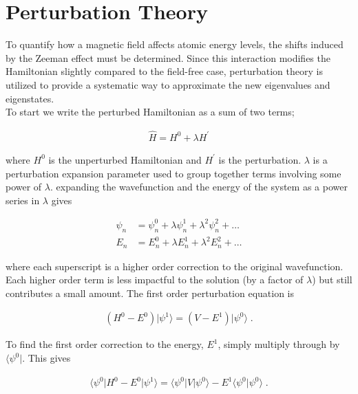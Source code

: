             

    \section{Perturbation Theory} \label{sec:Perturbation_Theory}
        To quantify how a magnetic field affects atomic energy levels, the shifts induced by the Zeeman effect must be determined. Since this interaction modifies the Hamiltonian slightly compared to the field-free case, perturbation theory is utilized to provide a systematic way to approximate the new eigenvalues and eigenstates.\\

        \noindent To start we write the perturbed Hamiltonian as a sum of two terms;

        \begin{align}
            \hat{H} = H^0 + \lambda H^\prime
        \end{align}

        \noindent where $H^0$ is the unperturbed Hamiltonian and $H^\prime$ is the perturbation. $\lambda$ is a perturbation expansion parameter used to group together terms involving some power of $\lambda$. expanding the wavefunction and the energy of the system as a power series in $\lambda$ gives \cite{Griffiths_2018}

        \begin{align}
            \psi_n &= \psi_n^0 + \lambda \psi_n^1 + \lambda^2 \psi_n^2 + \dots\\
            E_n &= E_n^0 + \lambda E_n^1 + \lambda^2 E_n^2 + \dots
        \end{align}

        \noindent where each superscript is a higher order correction to the original wavefunction. Each higher order term is less impactful to the solution (by a factor of $\lambda$) but still contributes a small amount. The first order perturbation equation is

        \begin{align}
            \left( H^0 - E^0 \right) \vert \psi^1 \rangle = \left(V - E^1 \right) \vert \psi^0 \rangle\;.
        \end{align}

        \noindent To find the first order correction to the energy, $E^1$, simply multiply through by $\langle \psi^0 \vert$. This gives

        \begin{align}
            \langle \psi^0 \vert H^0 - E^0 \vert \psi^1 \rangle = \langle \psi^0 \vert V \vert \psi^0 \rangle -E^1 \langle \psi^0  \vert \psi^0 \rangle\;.
        \end{align}

